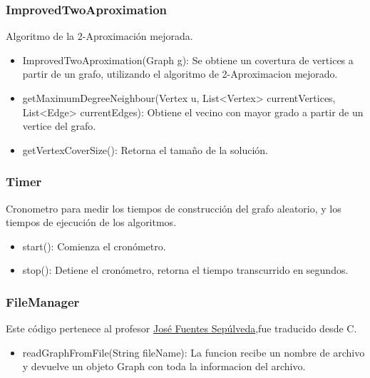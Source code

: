 \documentclass[letterpaper,10pt]{article}
\begin{document}
	\subsubsection{ImprovedTwoAproximation}

	Algoritmo de la 2-Aproximación mejorada.
    
	\begin{itemize}
	 \item ImprovedTwoAproximation(Graph g):  Se obtiene un covertura de vertices a partir de un grafo, utilizando el algoritmo de 2-Aproximacion mejorado.
    \item getMaximumDegreeNeighbour(Vertex u, List<Vertex> currentVertices, List<Edge> currentEdges): Obtiene el vecino con mayor grado a partir de un vertice del grafo.
    \item getVertexCoverSize(): Retorna el tamaño de la solución.
	\end{itemize}
	
	\subsubsection{Timer}

	Cronometro para medir los tiempos de construcción del grafo aleatorio, y los tiempos de ejecución de los algoritmos. 
	
	\begin{itemize}
	 \item start(): Comienza el cronómetro.
	 \item stop(): Detiene el cronómetro, retorna el tiempo transcurrido en segundos.
	\end{itemize}

	\subsubsection{FileManager}

	Este código pertenece al profesor \href{https://users.dcc.uchile.cl/~jfuentess/}{José Fuentes Sepúlveda},fue traducido desde C.
	
	\begin{itemize}
	 \item  readGraphFromFile(String fileName): La funcion recibe un nombre de archivo y devuelve un objeto Graph con toda la informacion del archivo.
	\end{itemize}
	
	
	



	\newpage
\end{document}
